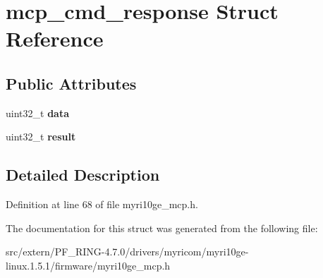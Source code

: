 \hypertarget{structmcp__cmd__response}{
\section{mcp\_\-cmd\_\-response Struct Reference}
\label{structmcp__cmd__response}
}
\subsection*{Public Attributes}
\begin{DoxyCompactItemize}
\item 
\hypertarget{structmcp__cmd__response_a090d011ffa2cd67ef853cce9785877b4}{
uint32\_\-t {\bfseries data}}
\label{structmcp__cmd__response_a090d011ffa2cd67ef853cce9785877b4}

\item 
\hypertarget{structmcp__cmd__response_aa1221858bc4b403b442212e5828afdf4}{
uint32\_\-t {\bfseries result}}
\label{structmcp__cmd__response_aa1221858bc4b403b442212e5828afdf4}

\end{DoxyCompactItemize}


\subsection{Detailed Description}


Definition at line 68 of file myri10ge\_\-mcp.h.



The documentation for this struct was generated from the following file:\begin{DoxyCompactItemize}
\item 
src/extern/PF\_\-RING-\/4.7.0/drivers/myricom/myri10ge-\/linux.1.5.1/firmware/myri10ge\_\-mcp.h\end{DoxyCompactItemize}
